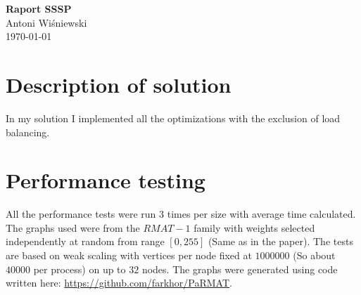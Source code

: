 \documentclass[a4paper,13pt,nontitlepage,onecolumn]{mwart}
\begin{document}
\Large\textbf{Raport SSSP}\\
\large{Antoni Wiśniewski}\\
\large{\today}

\large{
\vspace{.5cm}
\section{Description of solution}
In my solution I implemented all the optimizations with the exclusion of load balancing.

\section{Performance testing}
All the performance tests were run 3 times per size with average time calculated. The graphs used were from the $RMAT-1$ family with weights selected independently at random from range $[0, 255]$ (Same as in the paper). The tests are based on weak scaling with vertices per node fixed at $1000 000$ (So about $40 000$ per process) on up to $32$ nodes. The graphs were generated using code written here: \url{https://github.com/farkhor/PaRMAT}.
}
\end{document}
